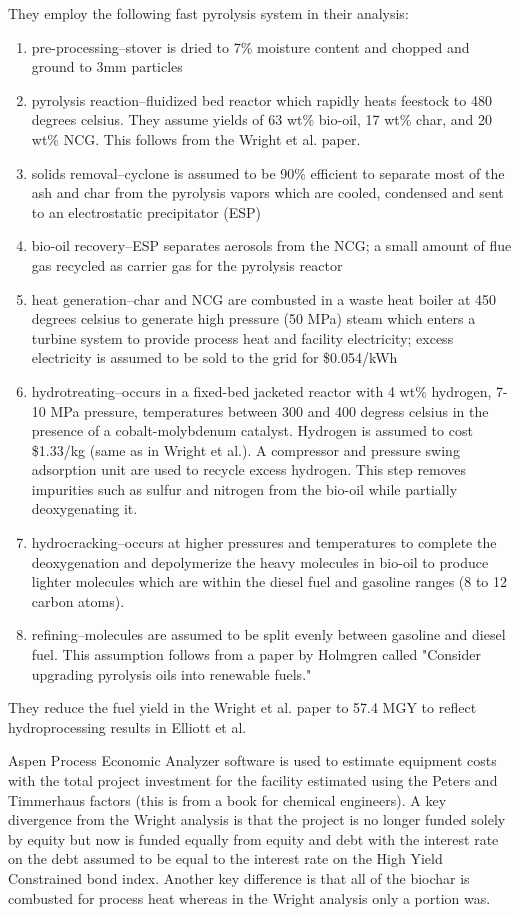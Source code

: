 \documentclass{article}\usepackage[]{graphicx}\usepackage[]{color}
\begin{document}
They employ the following fast pyrolysis system in their analysis:
\begin{enumerate}
\item pre-processing--stover is dried to 7\% moisture content and chopped and ground to 3mm particles
\item pyrolysis reaction--fluidized bed reactor which rapidly heats feestock to 480 degrees celsius.  They assume yields of 63 wt\% bio-oil, 17 wt\% char, and 20 wt\% NCG.  This follows from the Wright et al. paper.
\item solids removal--cyclone is assumed to be 90\% efficient to separate most of the ash and char from the pyrolysis vapors which are cooled, condensed and sent to an electrostatic precipitator (ESP)
\item bio-oil recovery--ESP separates aerosols from the NCG; a small amount of flue gas recycled as carrier gas for the pyrolysis reactor
\item heat generation--char and NCG are combusted in a waste heat boiler at 450 degrees celsius to generate high pressure (50 MPa) steam which enters a turbine system to provide process heat and facility electricity; excess electricity is assumed to be sold to the grid for \$0.054/kWh
\item hydrotreating--occurs in a fixed-bed jacketed reactor with 4 wt\% hydrogen, 7-10 MPa pressure, temperatures between 300 and 400 degress celsius in the presence of a cobalt-molybdenum catalyst.  Hydrogen is assumed to cost \$1.33/kg (same as in Wright et al.).  A compressor and pressure swing adsorption unit are used to recycle excess hydrogen.  This step removes impurities such as sulfur and nitrogen from the bio-oil while partially deoxygenating it.
\item hydrocracking--occurs at higher pressures and temperatures to complete the deoxygenation and depolymerize the heavy molecules in bio-oil to produce lighter molecules which are within the diesel fuel and gasoline ranges (8 to 12 carbon atoms).
\item refining--molecules are assumed to be split evenly between gasoline and diesel fuel.  This assumption follows from a paper by Holmgren called "Consider upgrading pyrolysis oils into renewable fuels."
\end{enumerate}

They reduce the fuel yield in the Wright et al. paper to 57.4 MGY to reflect hydroprocessing results in Elliott et al.

Aspen Process Economic Analyzer software is used to estimate equipment costs with the total project investment for the facility estimated using the Peters and Timmerhaus factors (this is from a book for chemical engineers).  A key divergence from the Wright analysis is that the project is no longer funded solely by equity but now is funded equally from equity and debt with the interest rate on the debt assumed to be equal to the interest rate on the High Yield Constrained bond index.  Another key difference is that all of the biochar is combusted for process heat whereas in the Wright analysis only a portion was.
\end{document}
